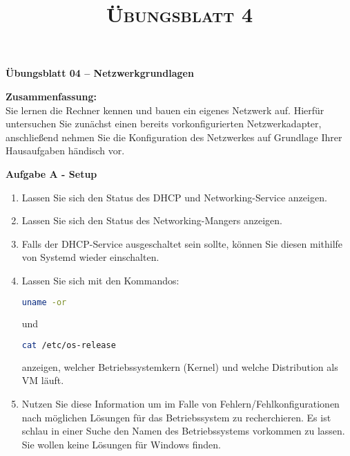 \documentclass[paper=a4,fontsize=11pt]{scrartcl}%
\title{	
\normalfont \normalsize 
\textsc{Übungsblatt 4}
}
\numberwithin{equation}{section}
\begin{document}
\begin{center}
\Large{\textbf{Übungsblatt 04 -- Netzwerkgrundlagen}}
\end{center}
\textbf{Zusammenfassung:}\\
Sie lernen die Rechner kennen und bauen ein eigenes Netzwerk auf. Hierfür untersuchen Sie zunächst einen bereits vorkonfigurierten Netzwerkadapter, anschließend nehmen Sie die Konfiguration des Netzwerkes auf Grundlage Ihrer Hausaufgaben händisch vor.
\begin{center}\Large{\textbf{Aufgabe A - Setup}}\end{center}\vskip0.25in
\begin{enumerate}
	\item Lassen Sie sich den Status des DHCP und Networking-Service anzeigen.
	\item Lassen Sie sich den Status des Networking-Mangers anzeigen.
	\item Falls der DHCP-Service ausgeschaltet sein sollte, können Sie diesen mithilfe von Systemd wieder einschalten.
	\item Lassen Sie sich mit den Kommandos:
			\begin{lstlisting}[style=Bash, language=Bash]
uname -or
		\end{lstlisting} und
				\begin{lstlisting}[style=Bash, language=Bash]
cat /etc/os-release
		\end{lstlisting} anzeigen, welcher Betriebssystemkern (Kernel) und welche Distribution als VM läuft.
	\item Nutzen Sie diese Information um im Falle von Fehlern/Fehlkonfigurationen nach möglichen Lösungen für das Betriebssystem zu recherchieren. Es ist schlau in einer Suche den Namen des Betriebssystems vorkommen zu lassen. Sie wollen keine Lösungen für Windows finden.
\end{enumerate}
	
\end{document}
